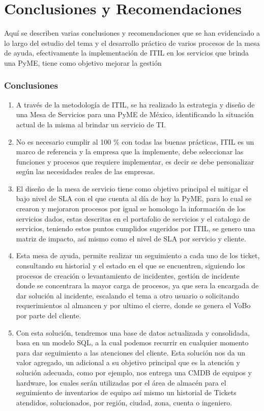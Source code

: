 \chapter{Conclusiones y Recomendaciones}

Aquí se describen varias conclusiones y recomendaciones que se han evidenciado
a lo largo del estudio del tema y el desarrollo práctico de varios procesos de la
mesa de ayuda, efectivamente la implementación de ITIL en los servicios que
brinda una PyME, tiene como objetivo mejorar la gestión
\subsection{Conclusiones}

\begin{enumerate}[1.]
\item A través de la metodología de ITIL, se ha realizado la estrategia y  diseño  de una Mesa de Servicios para una  PyME de México, identificando la situación actual de la misma al brindar un servicio de TI.

\item No es necesario cumplir al 100 \% con todas las buenas prácticas, ITIL es un
marco de referencia y la empresa que la implemente, debe seleccionar las
funciones y procesos que requiere implementar, es decir se debe personalizar
según las necesidades reales de las empresas. 
\item El diseño de la mesa de servicio tiene como objetivo principal el mitigar el  bajo nivel de SLA  con el que cuenta al día de hoy la PyME, para lo cual se crearon y mejoraron procesos por igual se  homologo la información de los servicios dados, estas descritas en el portafolio de servicios y el catalogo de servicios, teniendo estos puntos cumplidos sugeridos por ITIL, se genero una matriz de impacto, así mismo como el nivel de SLA por servicio y cliente. 
\item Esta mesa de ayuda, permite realizar un seguimiento a cada uno de los
ticket, consultando su historial  y el estado en el que se encuentren, siguiendo los procesos de creación o levantamiento de incidentes, gestión de incidente donde se concentrara la mayor carga de procesos, ya que sera la encargada de dar solución al incidente, escalando el tema a otro usuario o solicitando requerimientos al almancen y por ultimo el cierre, donde se genera el VoBo por parte del cliente. 

\item Con esta solución, tendremos una base de datos actualizada y consolidada, basa en un modelo SQL, a la cual podemos recurrir en cualquier momento para dar seguimiento a las atenciones del cliente. Esta solución nos da un valor agregado, un adicional a su objetivo principal que es la atención y solución adecuada, como por ejemplo, nos entrega una
CMDB de equipos y hardware, los cuales serán utilizadas por el área de almacén para el seguimiento de inventarios de equipo así mismo un historial de Tickets atendidos, solucionados, por región, ciudad, zona, cuenta o  ingeniero. 


\end{enumerate}
